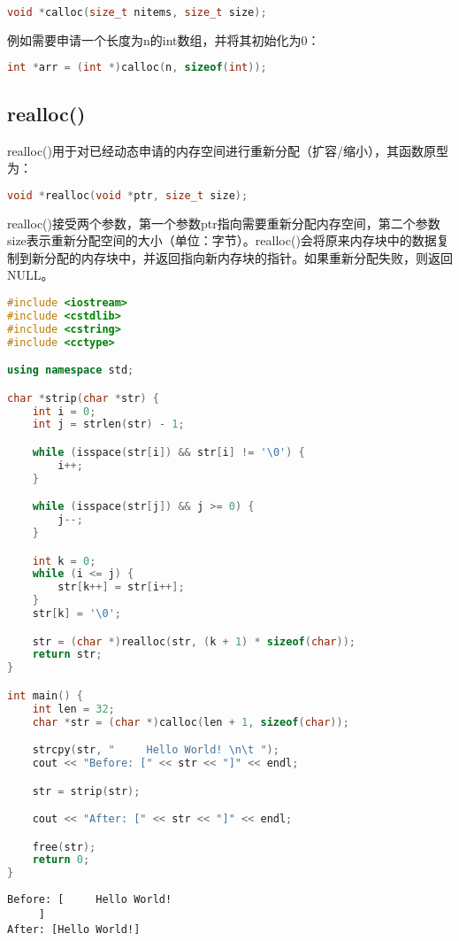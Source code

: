 \vspace{-0.5cm}

\begin{lstlisting}[language=C++]
void *calloc(size_t nitems, size_t size);
\end{lstlisting}

例如需要申请一个长度为n的int数组，并将其初始化为0：

\vspace{-0.5cm}

\begin{lstlisting}[language=C++]
int *arr = (int *)calloc(n, sizeof(int));
\end{lstlisting}

\vspace{0.5cm}

\subsection{realloc()}

realloc()用于对已经动态申请的内存空间进行重新分配（扩容/缩小），其函数原型为：

\vspace{-0.5cm}

\begin{lstlisting}[language=C++]
void *realloc(void *ptr, size_t size);
\end{lstlisting}

realloc()接受两个参数，第一个参数ptr指向需要重新分配内存空间，第二个参数size表示重新分配空间的大小（单位：字节）。realloc()会将原来内存块中的数据复制到新分配的内存块中，并返回指向新内存块的指针。如果重新分配失败，则返回NULL。\\


\begin{lstlisting}[language=C++]
#include <iostream>
#include <cstdlib>
#include <cstring>
#include <cctype>

using namespace std;

char *strip(char *str) {
    int i = 0;
    int j = strlen(str) - 1;

    while (isspace(str[i]) && str[i] != '\0') {
        i++;
    }

    while (isspace(str[j]) && j >= 0) {
        j--;
    }

    int k = 0;
    while (i <= j) {
        str[k++] = str[i++];
    }
    str[k] = '\0';

    str = (char *)realloc(str, (k + 1) * sizeof(char));
    return str;
}

int main() {
    int len = 32;
    char *str = (char *)calloc(len + 1, sizeof(char));

    strcpy(str, "     Hello World! \n\t ");
    cout << "Before: [" << str << "]" << endl;

    str = strip(str);

    cout << "After: [" << str << "]" << endl;

    free(str);
    return 0;
}
\end{lstlisting}

\begin{tcolorbox}
    \begin{verbatim}
Before: [     Hello World! 
     ]
After: [Hello World!]
	\end{verbatim}
\end{tcolorbox}

\newpage